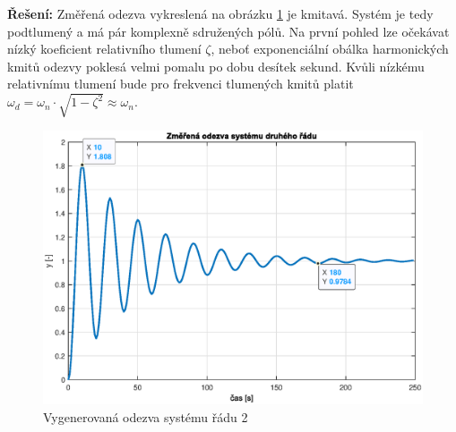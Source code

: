 \documentclass[twoside]{article}
\begin{document}
\textbf{Řešení:} Změřená odezva vykreslená na obrázku \ref{fig:zadani2} je kmitavá. Systém je tedy podtlumený a má pár komplexně sdružených pólů.
Na první pohled lze očekávat nízký koeficient relativního tlumení $\zeta$, neboť exponenciální obálka harmonických kmitů odezvy poklesá velmi pomalu po dobu desítek sekund.
Kvůli nízkému relativnímu tlumení bude pro frekvenci tlumených kmitů platit $\omega_d = \omega_n \cdot \sqrt{1 - \zeta^2} \approx \omega_n$.
\begin{figure}[hbtp]
	\centering
	\includegraphics[width=\linewidth]{zadani2.eps}
	\caption{Vygenerovaná odezva systému řádu 2}
	\label{fig:zadani2}
\end{figure}
\end{document}
